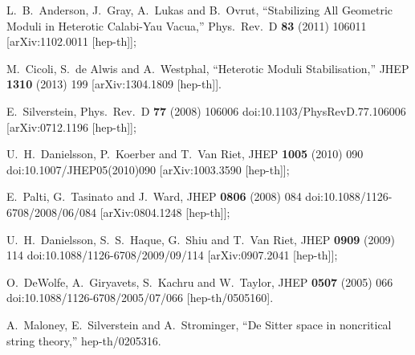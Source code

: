 \documentclass[11pt,a4paper]{article}
\begin{document}
\begin{thebibliography}{99}
  L.~B.~Anderson, J.~Gray, A.~Lukas and B.~Ovrut,
  ``Stabilizing All Geometric Moduli in Heterotic Calabi-Yau Vacua,''
  Phys.\ Rev.\ D {\bf 83} (2011) 106011  [arXiv:1102.0011 [hep-th]];  %
  
   M.~Cicoli, S.~de Alwis and A.~Westphal,
  ``Heterotic Moduli Stabilisation,''
  JHEP {\bf 1310} (2013) 199
  [arXiv:1304.1809 [hep-th]].
  

  E.~Silverstein,
  Phys.\ Rev.\ D {\bf 77} (2008) 106006
  doi:10.1103/PhysRevD.77.106006
  [arXiv:0712.1196 [hep-th]];

  U.~H.~Danielsson, P.~Koerber and T.~Van Riet,
  JHEP {\bf 1005} (2010) 090
  doi:10.1007/JHEP05(2010)090
  [arXiv:1003.3590 [hep-th]];

  E.~Palti, G.~Tasinato and J.~Ward,
  JHEP {\bf 0806} (2008) 084
  doi:10.1088/1126-6708/2008/06/084
  [arXiv:0804.1248 [hep-th]];


  U.~H.~Danielsson, S.~S.~Haque, G.~Shiu and T.~Van Riet,
  JHEP {\bf 0909} (2009) 114
  doi:10.1088/1126-6708/2009/09/114
  [arXiv:0907.2041 [hep-th]];

  O.~DeWolfe, A.~Giryavets, S.~Kachru and W.~Taylor,
  JHEP {\bf 0507} (2005) 066
  doi:10.1088/1126-6708/2005/07/066
  [hep-th/0505160].
  
  A.~Maloney, E.~Silverstein and A.~Strominger,
  ``De Sitter space in noncritical string theory,''
  hep-th/0205316.



\end{thebibliography}
\end{document}
